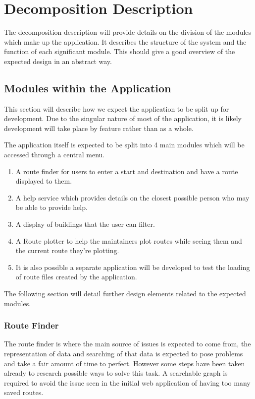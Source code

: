 \section{Decomposition Description}
The decomposition description will provide details on the division of the modules which make up the application. It describes the structure of the system and the function of each significant module. This should give a good overview of the expected design in an abstract way. 
\subsection{Modules within the Application}
This section will describe how we expect the application to be split up for development. Due to the singular nature of most of the application, it is likely development will take place by feature rather than as a whole.

The application itself is expected to be split into 4 main modules which will be accessed through a central menu. 
\begin{enumerate}
\item A route finder for users to enter a start and destination and have a route displayed to them.
\item A help service which provides details on the closest possible person who may be able to provide help.
\item A display of buildings that the user can filter.
\item A Route plotter to help the maintainers plot routes while seeing them and the current route they're plotting. 
\item It is also possible a separate application will be developed to test the loading of route files created by the application.
\end{enumerate}
The following section will detail further design elements related to the expected modules.
\subsubsection{Route Finder}
The route finder is where the main source of issues is expected to come from, the representation of data and searching of that data is expected to pose problems and take a fair amount of time to perfect. However some steps have been taken already to research possible ways to solve this task. A searchable graph is required to avoid the issue seen in the initial web application of having too many saved routes. 

